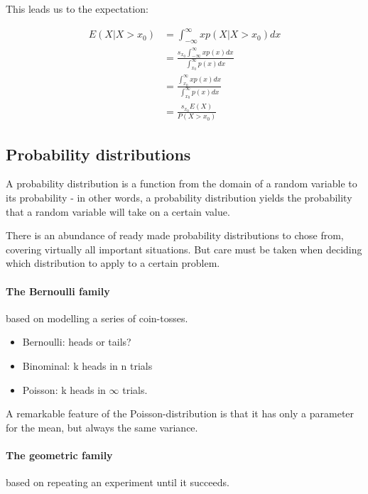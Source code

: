 This leads us to the expectation:

\begin{equation}
    \begin{aligned}
        E(X | X > x_0)  &= \int_{-\infty}^\infty x p(X | X > x_0) dx \\
                        &= \frac{ s_{x_0} \int_{-\infty}^\infty x p(x) dx }{ \int_{x_0}^\infty p(x) dx } \\
                        &= \frac{ \int_{x_0}^\infty x p(x) dx }{ \int_{x_0}^\infty p(x) dx } \\
                        &= \frac{ s_{x_0} E(X) }{ P(X > x_0) } 
    \end{aligned}
\end{equation}


\subsection{Probability distributions}

A probability distribution is a function from the domain of a random variable to its probability - in other words, a probability distribution yields the probability that a random variable will take on a certain value. 

There is an abundance of ready made probability distributions to chose from, covering virtually all important situations. But care must be taken when deciding which distribution to apply to a certain problem. 

\paragraph{The Bernoulli family} based on modelling a series of coin-tosses.
\begin{itemize}
    \item Bernoulli: heads or tails?
    \item Binominal: k heads in n trials
    \item Poisson: k heads in $\infty$ trials. 
\end{itemize}
A remarkable feature of the Poisson-distribution is that it has only a parameter for the mean, but always the same variance.

\paragraph{The geometric family} based on repeating an experiment until it succeeds. 



